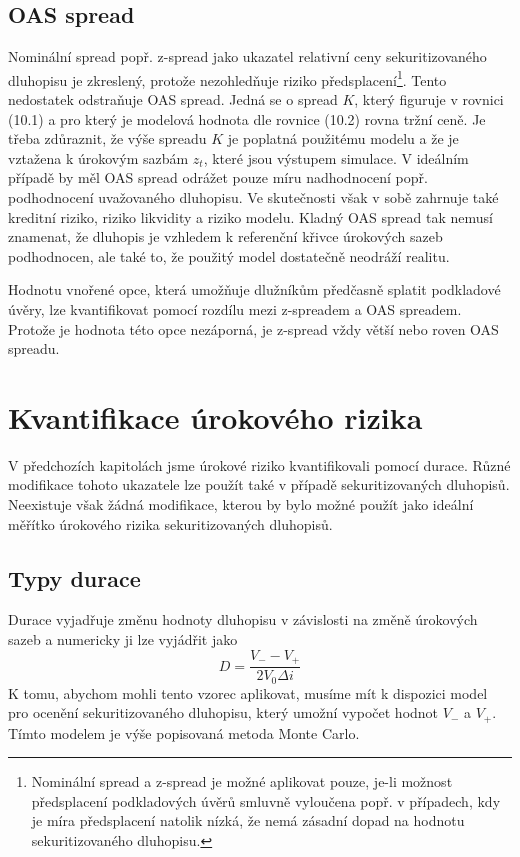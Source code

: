 \documentclass[a4paper]{book}
\begin{document}
\subsection{OAS spread}

Nominální spread popř. z-spread jako ukazatel relativní ceny sekuritizovaného dluhopisu je zkreslený, protože nezohledňuje riziko předsplacení\footnote{Nominální spread a z-spread je možné aplikovat pouze, je-li možnost předsplacení podkladových úvěrů smluvně vyloučena popř. v případech, kdy je míra předsplacení natolik nízká, že nemá zásadní dopad na hodnotu sekuritizovaného dluhopisu.}. Tento nedostatek odstraňuje OAS spread. Jedná se o spread $K$, který figuruje v rovnici (10.1) a pro který je modelová hodnota dle rovnice (10.2) rovna tržní ceně. Je třeba zdůraznit, že výše spreadu $K$ je poplatná použitému modelu a že je vztažena k úrokovým sazbám $z_t$, které jsou výstupem simulace. V ideálním případě by měl OAS spread odrážet pouze míru nadhodnocení popř. podhodnocení uvažovaného dluhopisu. Ve skutečnosti však v sobě zahrnuje také kreditní riziko, riziko likvidity a riziko modelu. Kladný OAS spread tak nemusí znamenat, že dluhopis je vzhledem k referenční křivce úrokových sazeb podhodnocen, ale také to, že použitý model dostatečně neodráží realitu.

Hodnotu vnořené opce, která umožňuje dlužníkům předčasně splatit podkladové úvěry, lze kvantifikovat pomocí rozdílu mezi z-spreadem a OAS spreadem. Protože je hodnota této opce nezáporná, je z-spread vždy větší nebo roven OAS spreadu.

\section{Kvantifikace úrokového rizika}

V předchozích kapitolách jsme úrokové riziko kvantifikovali pomocí durace. Různé modifikace tohoto ukazatele lze použít také v případě sekuritizovaných dluhopisů. Neexistuje však žádná modifikace, kterou by bylo možné použít jako ideální měřítko úrokového rizika sekuritizovaných dluhopisů.

\subsection{Typy durace}

Durace vyjadřuje změnu hodnoty dluhopisu v závislosti na změně úrokových sazeb a numericky ji lze vyjádřit jako
\begin{equation}
D = \frac{V_{-} - V_{+}}{2V_0 \Delta i}
\end{equation}
K tomu, abychom mohli tento vzorec aplikovat, musíme mít k dispozici model pro ocenění sekuritizovaného dluhopisu, který umožní vypočet hodnot $V_{-}$ a $V_{+}$. Tímto modelem je výše popisovaná metoda Monte Carlo.
\end{document}
